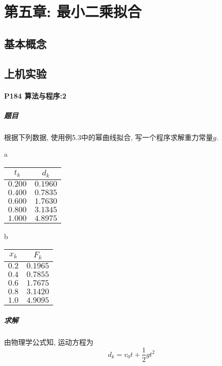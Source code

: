 \documentclass{ctexart}
\begin{document}
\section{第五章: 最小二乘拟合}
\subsection{基本概念}

\subsection{上机实验}
\paragraph{P184 算法与程序:2}
\subparagraph{题目}
根据下列数据, 使用例5.3中的幂曲线拟合, 写一个程序求解重力常量$g$.\\
\begin{minipage}{\textwidth}
	\begin{minipage}[t]{0.45\textwidth}
		\centering
		\makeatletter{}\makeatother\caption{a}
		\begin{tabular}{c|c}
			\hline
			$t_k$ & $d_k$ \\
			\hline
			$0.200$ & $0.1960$ \\
			$0.400$ & $0.7835$ \\
			$0.600$ & $1.7630$ \\
			$0.800$ & $3.1345$ \\
			$1.000$ & $4.8975$ \\
			\hline
		\end{tabular}
	\end{minipage}
	\begin{minipage}[t]{0.45\textwidth}
		\centering
		\makeatletter{}\makeatother\caption{b}
		\begin{tabular}{c|c}        
			\hline
			$x_k$ & $F_k$ \\
			\hline
			$0.2$ & $0.1965$ \\
			$0.4$ & $0.7855$ \\
			$0.6$ & $1.7675$ \\
			$0.8$ & $3.1420$ \\
			$1.0$ & $4.9095$ \\
			\hline
		\end{tabular}
	\end{minipage}
\end{minipage}
\subparagraph{求解}
由物理学公式知, 运动方程为
$$d_k = v_0t + \frac{1}{2}gt^2$$
\end{document}
